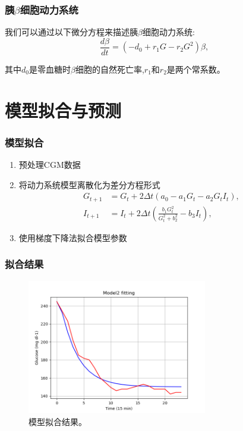 \documentclass{beamer}
\begin{document}
\begin{frame}
    \frametitle{胰$\beta$细胞动力系统}
    我们可以通过以下微分方程来描述胰$\beta$细胞动力系统:
    \begin{equation}
        \frac{d\beta}{dt} = (-d_0+r_1G-r_2G^2)\beta,
    \end{equation}
    
    其中$d_0$是零血糖时$\beta$细胞的自然死亡率,$r_1$和$r_2$是两个常系数\cite{topp2000model}。
    

\end{frame}
\section{模型拟合与预测}
\begin{frame}
  \frametitle{模型拟合}
  \begin{enumerate}
    \item 预处理CGM数据
    \item 将动力系统模型离散化为差分方程形式
    \begin{equation}
        \begin{aligned}
            G_{t+1} & = G_t + 2\Delta t(a_0-a_1G_t-a_2G_tI_t),  \\
            I_{t+1} & = I_t + 2\Delta t(\frac{b_1 G_t^2}{G_t^2 + b_2^2} - b_3 I_t),
        \end{aligned}
    \end{equation}
    \item 使用梯度下降法拟合模型参数
  \end{enumerate}
\end{frame}

\begin{frame}
    \frametitle{拟合结果}
    \begin{figure}[H]
        \centering
        \includegraphics[width=0.7\textwidth]{Img/fit.png}
        \caption{模型拟合结果。}
    \end{figure}
\end{frame}
\end{document}

